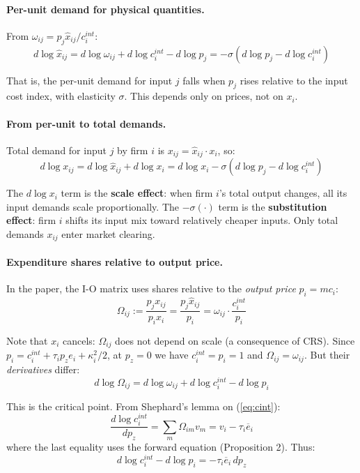 \documentclass[11pt]{article}
\begin{document}
\paragraph{Per-unit demand for physical quantities.} From $\omega_{ij} = p_j\hat{x}_{ij}/c_i^{int}$:
$$d\log \hat{x}_{ij} = d\log\omega_{ij} + d\log c_i^{int} - d\log p_j = -\sigma(d\log p_j - d\log c_i^{int})$$

That is, the per-unit demand for input $j$ falls when $p_j$ rises relative to the input cost index, with elasticity $\sigma$. This depends only on prices, not on $x_i$.

\paragraph{From per-unit to total demands.} Total demand for input $j$ by firm $i$ is $x_{ij} = \hat{x}_{ij} \cdot x_i$, so:
\begin{equation}
    \label{eq:total_from_perunit}
    d\log x_{ij} = d\log \hat{x}_{ij} + d\log x_i = d\log x_i - \sigma(d\log p_j - d\log c_i^{int})
\end{equation}

The $d\log x_i$ term is the \textbf{scale effect}: when firm $i$'s total output changes, all its input demands scale proportionally. The $-\sigma(\cdot)$ term is the \textbf{substitution effect}: firm $i$ shifts its input mix toward relatively cheaper inputs. Only total demands $x_{ij}$ enter market clearing.

\paragraph{Expenditure shares relative to output price.} In the paper, the I-O matrix uses shares relative to the \textit{output price} $p_i = mc_i$:
$$\Omega_{ij} := \frac{p_j x_{ij}}{p_i x_i} = \frac{p_j\hat{x}_{ij}}{p_i} = \omega_{ij}\cdot\frac{c_i^{int}}{p_i}$$

Note that $x_i$ cancels: $\Omega_{ij}$ does not depend on scale (a consequence of CRS). Since $p_i = c_i^{int} + \tau_i p_z e_i + \kappa_i^2/2$, at $p_z = 0$ we have $c_i^{int} = p_i = 1$ and $\Omega_{ij} = \omega_{ij}$. But their \textit{derivatives} differ:
\begin{equation}
    \label{eq:dlog_Omega}
    d\log \Omega_{ij} = d\log\omega_{ij} + d\log c_i^{int} - d\log p_i
\end{equation}

This is the critical point. From Shephard's lemma on (\ref{eq:cint}):
$$\frac{d\log c_i^{int}}{dp_z} = \sum_m \Omega_{im} v_m = v_i - \tau_i\overline{e}_i$$
where the last equality uses the forward equation (Proposition 2). Thus:
$$d\log c_i^{int} - d\log p_i = -\tau_i\overline{e}_i\, dp_z$$
\end{document}
